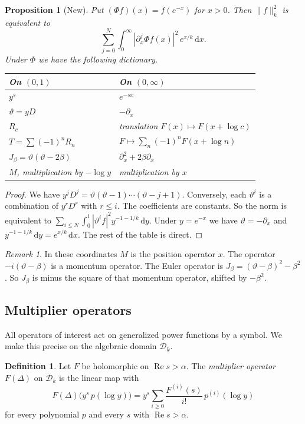 \documentclass[12pt,letterpaper]{article}
\newtheorem{proposition}[theorem]{Proposition}
\theoremstyle{definition}
\newtheorem{definition}[theorem]{Definition}
\theoremstyle{remark}
\newtheorem{remark}[theorem]{Remark}
\newcommand{\Ree}{\operatorname{Re}}
\newcommand{\dd}{\,\mathrm{d}}
\newcommand{\Dk}{\mathcal{D}_k}
\newcommand{\yD}{\vartheta}
\begin{document}
\begin{proposition}[New]\label{prop:logcoords}
Put $(\Phi f)(x)=f(e^{-x})$ for $x>0$. Then $\|f\|_k^2$ is equivalent to
\[
\sum_{j=0}^N\int_0^\infty|\partial_x^j\Phi f(x)|^2\,e^{x/k}\dd x.
\]
Under $\Phi$ we have the following dictionary.
\begin{center}
\begin{tabular}{@{}ll@{}}
\toprule
On $(0,1)$ & On $(0,\infty)$\\
\midrule
$y^s$ & $e^{-sx}$\\
$\yD=yD$ & $-\partial_x$\\
$R_c$ & translation $F(x)\mapsto F(x+\log c)$\\
$T=\sum(-1)^nR_n$ & $F\mapsto\sum_n(-1)^nF(x+\log n)$\\
$J_\beta=\yD(\yD-2\beta)$ & $\partial_x^2+2\beta\partial_x$\\
$M$, multiplication by $-\log y$ & multiplication by $x$\\
\bottomrule
\end{tabular}
\end{center}
\end{proposition}

\begin{proof}
We have $y^jD^j=\yD(\yD-1)\cdots(\yD-j+1)$. Conversely, each $\yD^i$ is a
combination of $y^rD^r$ with $r\le i$. The coefficients are constants. So
the norm is equivalent to $\sum_{i\le N}\int_0^1|\yD^if|^2y^{-1-1/k}\dd y$.
Under $y=e^{-x}$ we have $\yD=-\partial_x$ and
$y^{-1-1/k}\dd y=e^{x/k}\dd x$. The rest of the table is direct.
\end{proof}

\begin{remark}
In these coordinates $M$ is the position operator $x$. The operator
$-i(\yD-\beta)$ is a momentum operator. The Euler operator is
$J_\beta=(\yD-\beta)^2-\beta^2$. So $J_\beta$ is minus the square of that
momentum operator, shifted by $-\beta^2$.
\end{remark}

\subsection{Multiplier operators}

All operators of interest act on generalized power functions by a symbol.
We make this precise on the algebraic domain $\Dk$.

\begin{definition}\label{def:multiplier}
Let $F$ be holomorphic on $\Ree s>\alpha$. The \emph{multiplier operator}
$F(\Delta)$ on $\Dk$ is the linear map with
\[
F(\Delta)\bigl(y^s\,p(\log y)\bigr)
=y^s\sum_{i\ge0}\frac{F^{(i)}(s)}{i!}\,p^{(i)}(\log y)
\]
for every polynomial $p$ and every $s$ with $\Ree s>\alpha$.
\end{definition}
\end{document}
